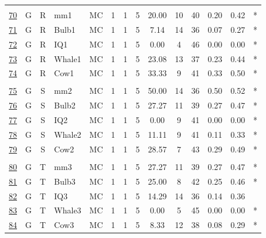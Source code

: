 \documentclass[12pt,english,nohyper]{tufte-handout}\usepackage[]{graphicx}\usepackage[]{color}
\begin{document}
\begin{longtable}{cccl|cccc|ccccc|l}
   &  &  &  &  &  &  &  &  &  &  &  &  &  \\ 
  \hyperlink{T06.G.R.05.1.1.MC.mm1.2}{70} & G & R & mm1 & MC &   1 &   1 &   5 & 20.00 &  10 &  40 & 0.20 & 0.42 & * \\ 
  \hyperlink{T06.G.R.05.1.1.MC.Bulb1.2}{71} & G & R & Bulb1 & MC &   1 &   1 &   5 & 7.14 &  14 &  36 & 0.07 & 0.27 & * \\ 
  \hyperlink{T06.G.R.05.1.1.MC.IQ1.2}{72} & G & R & IQ1 & MC &   1 &   1 &   5 & 0.00 &   4 &  46 & 0.00 & 0.00 & * \\ 
  \hyperlink{T06.G.R.05.1.1.MC.Whale1.2}{73} & G & R & Whale1 & MC &   1 &   1 &   5 & 23.08 &  13 &  37 & 0.23 & 0.44 & * \\ 
  \hyperlink{T06.G.R.05.1.1.MC.Cow1.2}{74} & G & R & Cow1 & MC &   1 &   1 &   5 & 33.33 &   9 &  41 & 0.33 & 0.50 & * \\ 
   &  &  &  &  &  &  &  &  &  &  &  &  &  \\ 
  \hyperlink{T06.G.S.05.1.1.MC.mm2.2}{75} & G & S & mm2 & MC &   1 &   1 &   5 & 50.00 &  14 &  36 & 0.50 & 0.52 & * \\ 
  \hyperlink{T06.G.S.05.1.1.MC.Bulb2.2}{76} & G & S & Bulb2 & MC &   1 &   1 &   5 & 27.27 &  11 &  39 & 0.27 & 0.47 & * \\ 
  \hyperlink{T06.G.S.05.1.1.MC.IQ2.2}{77} & G & S & IQ2 & MC &   1 &   1 &   5 & 0.00 &   9 &  41 & 0.00 & 0.00 & * \\ 
  \hyperlink{T06.G.S.05.1.1.MC.Whale2.2}{78} & G & S & Whale2 & MC &   1 &   1 &   5 & 11.11 &   9 &  41 & 0.11 & 0.33 & * \\ 
  \hyperlink{T06.G.S.05.1.1.MC.Cow2.2}{79} & G & S & Cow2 & MC &   1 &   1 &   5 & 28.57 &   7 &  43 & 0.29 & 0.49 & * \\ 
   &  &  &  &  &  &  &  &  &  &  &  &  &  \\ 
  \hyperlink{T06.G.T.05.1.1.MC.mm3.2}{80} & G & T & mm3 & MC &   1 &   1 &   5 & 27.27 &  11 &  39 & 0.27 & 0.47 & * \\ 
  \hyperlink{T06.G.T.05.1.1.MC.Bulb3.2}{81} & G & T & Bulb3 & MC &   1 &   1 &   5 & 25.00 &   8 &  42 & 0.25 & 0.46 & * \\ 
  \hyperlink{T06.G.T.05.1.1.MC.IQ3.2}{82} & G & T & IQ3 & MC &   1 &   1 &   5 & 14.29 &  14 &  36 & 0.14 & 0.36 &  \\ 
  \hyperlink{T06.G.T.05.1.1.MC.Whale3.2}{83} & G & T & Whale3 & MC &   1 &   1 &   5 & 0.00 &   5 &  45 & 0.00 & 0.00 & * \\ 
  \hyperlink{T06.G.T.05.1.1.MC.Cow3.2}{84} & G & T & Cow3 & MC &   1 &   1 &   5 & 8.33 &  12 &  38 & 0.08 & 0.29 & * \\ 

\end{longtable}
\end{document}
